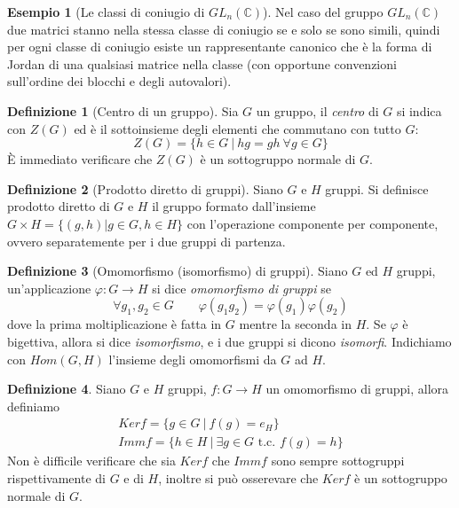 \documentclass[11pt]{article}
\theoremstyle{plain}
\theoremstyle{definition}
\newtheorem{defn}{Definizione}[section]
\newtheorem{exmp}{Esempio}[section]
\theoremstyle{remark}
\newcommand{\C}{\mathbb{C}}
\begin{document}
\begin{exmp}[Le classi di coniugio di $GL_n(\C)$]
Nel caso del gruppo $GL_n(\C)$ due matrici stanno nella stessa classe di coniugio se e solo se sono simili, quindi per ogni classe di coniugio esiste un rappresentante canonico che è la forma di Jordan di una qualsiasi matrice nella classe (con opportune convenzioni sull'ordine dei blocchi e degli autovalori).
\end{exmp}

\begin{defn}[Centro di un gruppo]
	Sia $G$ un gruppo, il \textit{centro} di $G$ si indica con $Z(G)$ ed è il sottoinsieme degli elementi che commutano con tutto $G$:
	\[
		Z(G)=\{ h\in G\ |\ hg=gh\ \forall g\in G \}
	\]
	\`E immediato verificare che $Z(G)$ è un sottogruppo normale di $G$.

\end{defn}

\begin{defn}[Prodotto diretto di gruppi]
Siano $G$ e $H$ gruppi. Si definisce prodotto diretto di $G$ e $H$ il gruppo formato dall'insieme $G \times H = \{ (g, h) | g \in G, h \in H\}$ con l'operazione componente per componente, ovvero separatemente per i due gruppi di partenza.
\end{defn}


\begin{defn}[Omomorfismo (isomorfismo) di gruppi]
Siano $G$ ed $H$ gruppi, un'applicazione $\varphi:G\to H$ si dice \textit{omomorfismo di gruppi} se
\[
	\forall g_1,g_2\in G\qquad \varphi(g_1 g_2)=\varphi(g_1)\varphi(g_2)
\]
dove la prima moltiplicazione è fatta in $G$ mentre la seconda in $H$.
Se $\varphi$ è bigettiva, allora si dice \textit{isomorfismo}, e i due gruppi si dicono \emph{isomorfi}.
Indichiamo con $Hom(G,H)$ l'insieme degli omomorfismi da $G$ ad $H$.
\end{defn}

\begin{defn}
	Siano $G$ e $H$ gruppi, $f:G\to H$ un omomorfismo di gruppi, allora definiamo
	\begin{gather*}
		Ker f = \{g\in G\ |\ f(g)=e_H\}\\
		Imm f =\{ h\in H\ |\ \exists g\in G\text{ t.c. }f(g)=h\}
	\end{gather*}
	Non è difficile verificare che sia $Ker f$ che $Imm f$ sono sempre sottogruppi rispettivamente di $G$ e di $H$, inoltre si può osserevare che $Ker f$ è un sottogruppo normale di $G$.
\end{defn}
\end{document}
